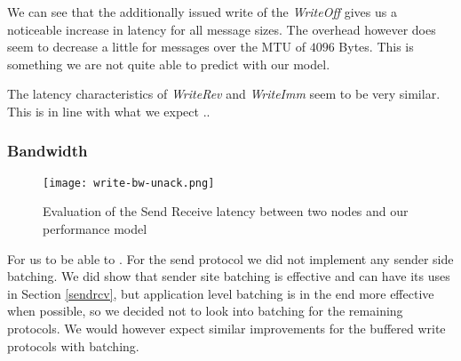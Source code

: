 We can see that the additionally issued write of the \emph{WriteOff} gives us a noticeable increase in latency for all message
sizes. The overhead however does seem to decrease a little for messages over the MTU of $4096$ Bytes. This is something we are
not quite able to predict with our model. 

The latency characteristics of \emph{WriteRev} and \emph{WriteImm} seem to be very similar. This is in line with what we expect
..

\subsubsection{Bandwidth}

\begin{figure}[h]
\texttt{[image: write-bw-unack.png]}
\caption{Evaluation of the Send Receive latency between two nodes and our performance model}
\label{fig:plot-write-bw-unack}
\end{figure}

For us to be able to . For the send protocol 
we did not implement any sender side batching. We did show that sender site batching is effective and can have its uses in 
Section \ref{sendrcv}, but application level batching is in the end more effective when possible, so we decided not to look 
into batching for the remaining protocols. We would however expect similar improvements for the buffered write 
protocols with batching.







